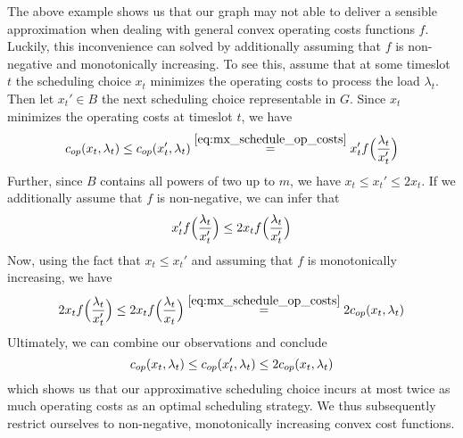 The above example shows us that our graph may not able to deliver a sensible approximation when dealing with general convex operating costs functions $f$. Luckily, this inconvenience can solved by additionally assuming that $f$ is non-negative and monotonically increasing. To see this, assume that at some timeslot $t$ the scheduling choice $x_t$ minimizes the operating costs to process the load $\lambda_t$. Then let $x_t'\in B$ the next scheduling choice representable in $G$. Since $x_t$ minimizes the operating costs at timeslot $t$, we have
\begin{equation*}
	c_{op}(x_t,\lambda_t)\le c_{op}(x_t',\lambda_t)\stackrel{\eqref{eq:mx_schedule_op_costs}}{=}x_t'f\Bigl(\frac{\lambda_t}{x_t'}\Bigr)
\end{equation*}
Further, since $B$ contains all powers of two up to $m$, we have $x_t\le x_t'\le 2x_t$. If we additionally assume that $f$ is non-negative, we can infer that
\begin{equation*}
	x_t'f\Bigl(\frac{\lambda_t}{x_t'}\Bigr)\le2x_tf\Bigl(\frac{\lambda_t}{x_t'}\Bigr)
\end{equation*}
Now, using the fact that $x_t\le x_t'$ and assuming that $f$ is monotonically increasing, we have
\begin{equation*}
	2x_tf\Bigl(\frac{\lambda_t}{x_t'}\Bigr)\le 2x_tf\Bigl(\frac{\lambda_t}{x_t}\Bigr)\stackrel{\eqref{eq:mx_schedule_op_costs}}{=}2c_{op}(x_t,\lambda_t)
\end{equation*}
Ultimately, we can combine our observations and conclude
\begin{equation*}
	c_{op}(x_t,\lambda_t)\le c_{op}(x_t',\lambda_t)\le2c_{op}(x_t,\lambda_t)
\end{equation*}
which shows us that our approximative scheduling choice incurs at most twice as much operating costs as an optimal scheduling strategy. We thus subsequently restrict ourselves to non-negative, monotonically increasing convex cost functions.

